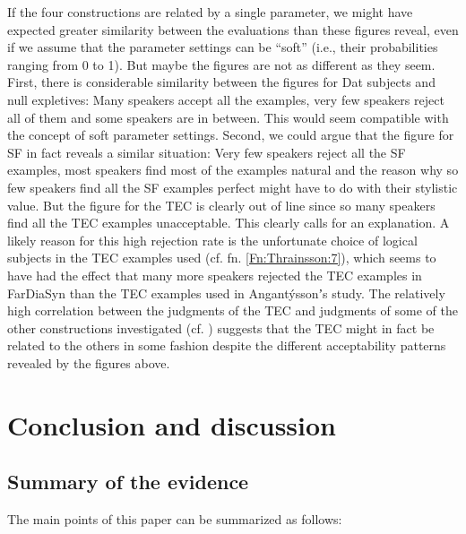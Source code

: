 \documentclass[output=paper]{LSP/langsci}
\begin{document}
If the four constructions are related by a single parameter, we might have expected greater similarity between the evaluations than these figures reveal, even if we assume that the parameter settings can be “soft” (i.e., their probabilities ranging from 0 to 1). But maybe the figures are not as different as they seem. First, there is considerable similarity between the figures for Dat subjects and null expletives: Many speakers accept all the examples, very few speakers reject all of them and some speakers are in between. This would seem compatible with the concept of soft parameter settings. Second, we could argue that the figure for SF in fact reveals a similar situation: Very few speakers reject all the SF examples, most speakers find most of the examples natural and the reason why so few speakers find all the SF examples perfect might have to do with their stylistic value. But the figure for the TEC is clearly out of line since so many speakers find all the TEC examples unacceptable. This clearly calls for an explanation. A likely reason for this high rejection rate is the unfortunate choice of logical subjects in the TEC examples used (cf. fn. \ref{Fn:Thrainsson:7}), which seems to have had the effect that many more speakers rejected the TEC examples in FarDiaSyn than the TEC examples used in Angantýssonʼs study. The relatively high correlation between the judgments of the TEC and judgments of some of the other constructions investigated (cf. ) suggests that the TEC might in fact be related to the others in some fashion despite the different acceptability patterns revealed by the figures above.

\section{Conclusion and discussion}\label{sec:Thrainsson:5}
\subsection{Summary of the evidence}

The main points of this paper can be summarized as follows:
\end{document}
